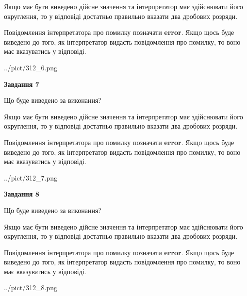 \documentclass[12pt, ukrainian]{article}
\begin{document}
{\begin {Large}
Якщо має бути виведено дійсне значення та інтерпретатор має здійснювати його округлення, 
то у відповіді достатньо правильно вказати два дробових розряди.

Повідомлення інтерпретатора про помилку позначати \textbf{error}.
Якщо щось буде виведено до того, як інтерпретатор видасть повідомлення про помилку, 
то воно має вказуватись у відповіді. \par

\begin{center}
	{../pict/312_6.png}
\end{center}
\newpage

{\begin {center}\textbf{Завдання 7}\end {center}}\par
Що буде виведено за виконання? \par

Якщо має бути виведено дійсне значення та інтерпретатор має здійснювати його округлення, 
то у відповіді достатньо правильно вказати два дробових розряди.

Повідомлення інтерпретатора про помилку позначати \textbf{error}.
Якщо щось буде виведено до того, як інтерпретатор видасть повідомлення про помилку, 
то воно має вказуватись у відповіді. \par

\begin{center}
	{../pict/312_7.png}
\end{center}
\newpage

{\begin {center}\textbf{Завдання 8}\end {center}}\par
Що буде виведено за виконання? \par

Якщо має бути виведено дійсне значення та інтерпретатор має здійснювати його округлення, 
то у відповіді достатньо правильно вказати два дробових розряди.

Повідомлення інтерпретатора про помилку позначати \textbf{error}.
Якщо щось буде виведено до того, як інтерпретатор видасть повідомлення про помилку, 
то воно має вказуватись у відповіді. \par

\begin{center}
	{../pict/312_8.png}
\end{center}
\newpage


\end{Large}}
\end{document}
